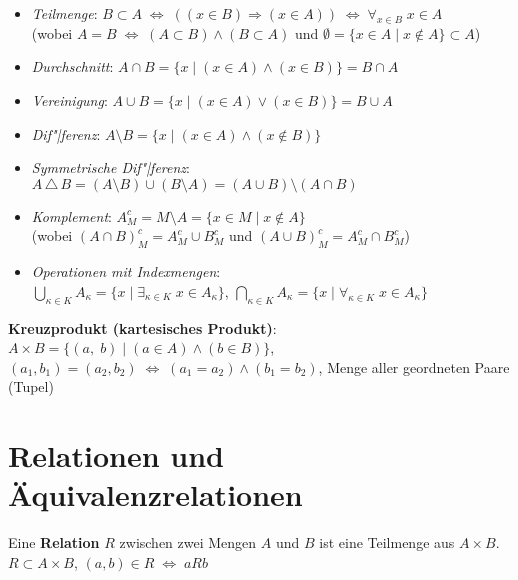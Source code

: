 \begin{itemize}
    \item \emph{Teilmenge}: $B \subset A \;\Leftrightarrow\;
    ((x \in B) \Rightarrow (x \in A)) \;\Leftrightarrow\;
    \forall_{x \in B}\; x \in A$
    \\ (wobei
    $A = B \;\Leftrightarrow\; (A \subset B) \land (B \subset A)$ und
    $\emptyset = \{x \in A \;|\; x \notin A\} \subset A$)

    \item \emph{Durchschnitt}:
    $A \cap B = \{x \;|\; (x \in A) \land (x \in B)\} = B \cap A$

    \item \emph{Vereinigung}: $A \cup B = \{x \;|\; (x \in A) \lor (x \in B)\}
    = B \cup A$

    \item \emph{Dif"|ferenz}: $A \setminus B = \{x \;|\; (x \in A) \land
    (x \notin B)\}$

    \item \emph{Symmetrische Dif"|ferenz}: $A \,\triangle\, B =
    (A \setminus B) \cup (B \setminus A) = (A \cup B) \setminus (A \cap B)$

    \item \emph{Komplement}:
    $A_M^c = M \setminus A = \{x \in M \;|\; x \notin A\}$ \\
    (wobei
    $(A \cap B)_M^c = A_M^c \cup B_M^c$ und
    $(A \cup B)_M^c = A_M^c \cap B_M^c$)

    \item \emph{Operationen mit Indexmengen}: \\
    $\bigcup_{\kappa \in K} A_\kappa =
    \{x \;|\; \exists_{\kappa \in K}\; x \in A_\kappa\}$,
    $\bigcap_{\kappa \in K} A_\kappa =
    \{x \;|\; \forall_{\kappa \in K}\; x \in A_\kappa\}$
\end{itemize}

\textbf{Kreuzprodukt (kartesisches Produkt)}:
$A \times B = \{(a,\; b) \;|\; (a \in A) \land (b \in B)\}$, \\
$(a_1, b_1) = (a_2, b_2) \;\Leftrightarrow\; (a_1 = a_2) \land (b_1 = b_2)$,
Menge aller geordneten Paare (Tupel)

\section{%
    Relationen und Äquivalenzrelationen%
}

Eine \textbf{Relation} $R$ zwischen zwei Mengen $A$ und $B$ ist eine Teilmenge
aus $A \times B$. \\
$R \subset A \times B$, $(a,b) \in R \;\Leftrightarrow\; a R b$

